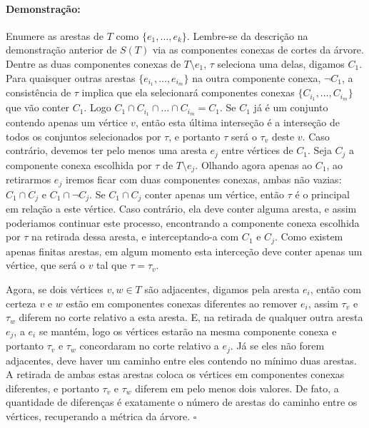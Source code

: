 \documentclass[11pt]{article}
\newcommand{\pulinho}{\vspace{.5cm}}
\theoremstyle{definition}
\theoremstyle{definition}
\theoremstyle{definition}
\theoremstyle{definition}
\theoremstyle{definition}
\theoremstyle{definition}
\theoremstyle{definition}
\theoremstyle{definition}
\theoremstyle{definition}
\theoremstyle{definition}
\theoremstyle{definition}
\theoremstyle{definition}
\newenvironment{prova}{\paragraph{Demonstração:}}{\hfill$\square$ 
\pulinho
}
\theoremstyle{definition}
\theoremstyle{definition}
\begin{document}
\begin{prova}
Enumere as arestas de $T$ como $\{e_1,\dots, e_k\}$. Lembre-se da descrição na demonstração anterior de $S(T)$ via as componentes conexas de cortes da árvore. Dentre as duas componentes conexas de $T \setminus e_1$, $\tau$ seleciona uma delas, digamos $C_1$. Para quaisquer outras arestas $\{e_{i_1}, \dots, e_{i_m}\}$ na outra componente conexa, $\lnot C_1$, a consistência de $\tau$ implica que ela selecionará componentes conexas $\{C_{i_1}, \dots, C_{i_m}\}$ que vão conter $C_1$. Logo $C_1 \cap C_{i_1} \cap \dots \cap C_{i_m} = C_1$. Se $C_1$ já é um conjunto contendo apenas um vértice $v$, então esta última interseção é a interseção de todos os conjuntos selecionados por $\tau$, e portanto $\tau$ será o $\tau_v$ deste $v$. Caso contrário, devemos ter pelo menos uma aresta $e_j$ entre vértices de $C_1$. Seja $C_j$ a componente conexa escolhida por $\tau$ de $T \setminus e_j$. Olhando agora apenas ao $C_1$, ao retirarmos $e_j$ iremos ficar com duas componentes conexas, ambas não vazias: $C_1 \cap C_j$ e $C_1 \cap \lnot C_j$. Se $C_1 \cap C_j$ conter apenas um vértice, então $\tau$ é o principal em relação a este vértice. Caso contrário, ela deve conter alguma aresta, e assim poderiamos continuar este processo, encontrando a componente conexa escolhida por $\tau$ na retirada dessa aresta, e interceptando-a com $C_1$ e $C_j$. Como existem apenas finitas arestas, em algum momento esta interceção deve conter apenas um vértice, que será o $v$ tal que $\tau = \tau_v$.

Agora, se dois vértices $v,w \in T$ são adjacentes, digamos pela aresta $e_i$, então com certeza $v$ e $w$ estão em componentes conexas diferentes ao remover $e_i$, assim $\tau_v$ e $\tau_w$ diferem no corte relativo a esta aresta. E, na retirada de qualquer outra aresta $e_j$, a $e_i$ se mantém, logo os vértices estarão na mesma componente conexa e portanto $\tau_v$ e $\tau_w$ concordaram no corte relativo a $e_j$. Já se eles não forem adjacentes, deve haver um caminho entre eles contendo no mínimo duas arestas. A retirada de ambas estas arestas coloca os vértices em componentes conexas diferentes, e portanto $\tau_v$ e $\tau_w$ diferem em pelo menos dois valores. De fato, a quantidade de diferenças é exatamente o número de arestas do caminho entre os vértices, recuperando a métrica da árvore.
\end{prova}

\end{document}
